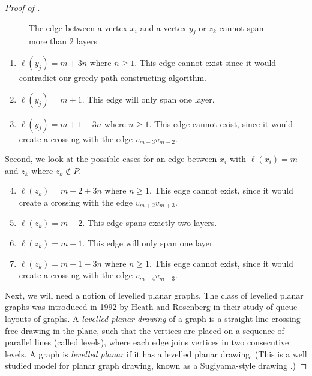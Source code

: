 \documentclass{patmorin}
\begin{document}
\begin{proof}[Proof of ]
\begin{figure}
\begin{center}
    \caption{The edge between a vertex $x_i$ and a vertex $y_j$ or $z_k$ cannot span more than 2 layers}
 \end{center}
    \end{figure}

  \begin{enumerate}
  	\item$\ell(y_j) =  m+3n$ where $n \geq 1$. This edge cannot exist since it would contradict our greedy path constructing algorithm.
  	\item$\ell(y_j) =  m+1$. This edge will only span one layer.
  	\item $\ell(y_j) = m+1-3n$ where $n \geq 1$. This edge cannot exist, since it would create a crossing with the edge $v_{m-3}v_{m-2}$.
  \end{enumerate}

  Second, we look at the possible cases for an edge between $x_i$ with $\ell(x_i) = m$ and $z_k$ where $z_k \notin P$.
 \begin{enumerate}
  \setcounter{enumi}{3}
  	\item $\ell(z_k) = m+2+3n$ where $n \geq 1$. This edge cannot exist, since it would create a crossing with the edge $v_{m+2}v_{m+3}$.
  	\item$\ell(z_k) =  m+2$. This edge spans exactly two layers.
  	\item$\ell(z_k) =  m-1$. This edge will only span one layer.
  	\item $\ell(z_k) =  m-1-3n$ where $n \geq 1$. This edge cannot exist, since it would create a crossing with the edge $v_{m-4}v_{m-3}$.
  \end{enumerate}


  Next, we will need a notion of levelled planar graphs. The class of levelled
  planar graphs was introduced in 1992 by Heath and Rosenberg
  \cite{HR-SJC92} in their study of queue layouts of graphs. A \emph{levelled
  planar drawing} of a graph is a straight-line crossing-free drawing in
  the plane, such that the vertices are placed on a sequence of parallel
  lines (called levels), where each edge joins vertices in two
  consecutive levels. A graph is \emph{levelled planar} if it has a levelled
  planar drawing. (This is a well studied model for planar
  graph drawing, known as a Sugiyama-style drawing \cite{STT81,BM2001,HN2013,BETT99}.)


\end{proof}
\end{document}
